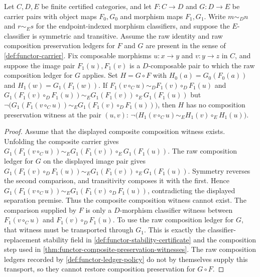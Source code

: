 \begin{proposition}\label{prop:functor-composition-preservation-empty-ledger-sameness-respect-required} Let $C,D,E$ be finite certified categories, and let $F:C\to D$ and $G:D\to E$ be carrier pairs with object maps $F_0,G_0$ and morphism maps $F_1,G_1$. Write $m\sim_D n$ and $r\sim_E s$ for the endpoint-indexed morphism classifiers, and suppose the $E$-classifier is symmetric and transitive. Assume the raw identity and raw composition preservation ledgers for $F$ and $G$ are present in the sense of \autoref{def:functor-carrier}. Fix composable morphisms $u:x\to y$ and $v:y\to z$ in $C$, and suppose the image pair $F_1(u),F_1(v)$ is a $D$-composable pair to which the raw composition ledger for $G$ applies. Set $H=G\circ F$ with $H_0(a)=G_0(F_0(a))$ and $H_1(w)=G_1(F_1(w))$. If $F_1(v\circ_C u)\sim_D F_1(v)\circ_D F_1(u)$ and $G_1(F_1(v)\circ_D F_1(u))\sim_E G_1(F_1(v))\circ_E G_1(F_1(u))$ but $\neg\bigl(G_1(F_1(v\circ_C u))\sim_E G_1(F_1(v)\circ_D F_1(u))\bigr)$, then $H$ has no composition preservation witness at the pair $(u,v)$: $\neg\bigl(H_1(v\circ_C u)\sim_E H_1(v)\circ_E H_1(u)\bigr)$. \end{proposition} \begin{proof} Assume that the displayed composite composition witness exists. Unfolding the composite carrier gives $G_1(F_1(v\circ_C u))\sim_E G_1(F_1(v))\circ_E G_1(F_1(u))$. The raw composition ledger for $G$ on the displayed image pair gives $G_1(F_1(v)\circ_D F_1(u))\sim_E G_1(F_1(v))\circ_E G_1(F_1(u))$. Symmetry reverses the second comparison, and transitivity composes it with the first. Hence $G_1(F_1(v\circ_C u))\sim_E G_1(F_1(v)\circ_D F_1(u))$, contradicting the displayed separation premise. Thus the composite composition witness cannot exist. The comparison supplied by $F$ is only a $D$-morphism classifier witness between $F_1(v\circ_C u)$ and $F_1(v)\circ_D F_1(u)$. To use the raw composition ledger for $G$, that witness must be transported through $G_1$. This is exactly the classifier-replacement stability field in \autoref{def:functor-stability-certificate} and the composition step used in \autoref{thm:functor-composite-preservation-witnesses}. The raw composition ledgers recorded by \autoref{def:functor-ledger-policy} do not by themselves supply this transport, so they cannot restore composition preservation for $G\circ F$. \end{proof}


